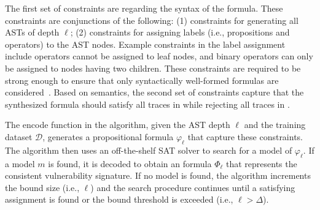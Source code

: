The first set of constraints
are regarding the syntax of the \pltl formula. These constraints are conjunctions
of the following:
(1) constraints for generating all  ASTs of depth $\ell$;
(2) constraints for assigning labels (i.e., propositions and operators) to the
AST nodes. Example constraints in the label assignment
include operators cannot be assigned to leaf nodes,  and binary operators can only be
assigned to nodes having two children. These
constraints are required to be strong enough to ensure that
only syntactically well-formed \pltl formulas are considered~\cite{mc03}.
Based on \pltl semantics, the second set of constraints capture that the synthesized formula should satisfy
all traces in  while rejecting all traces in .

The encode function in the algorithm, given the AST depth $\ell$  and the training dataset
$\mathcal{D}$, generates a propositional formula $\varphi_\ell$ that capture these constraints.
%
The algorithm then uses an off-the-shelf SAT solver to search for a model of $\varphi_\ell$.
%
If a model  $m$ is found, it is decoded to obtain an \pltl formula
$\Phi_\ell$ that represents the consistent vulnerability signature. If no model is found,
the algorithm increments the bound size (i.e., $\ell$) and the search procedure continues
until a satisfying assignment is found or the bound threshold  is exceeded (i.e., $\ell > \Delta$).
